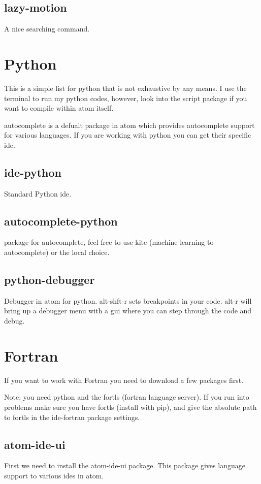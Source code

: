\documentclass[preprint,showpacs,preprintnumbers,amsmath,amssymb]{revtex4}
\begin{document}
\subsection{lazy-motion}
A nice searching command.

\section{Python}
This is a simple list for python that is not exhaustive by any means.
I use the terminal to run my python codes, however, look into the script package
if you want to compile within atom itself.

autocomplete is a defualt package in atom which provides autocomplete support
for various languages.
If you are working with python you can get their specific ide.

\subsection{ide-python}
Standard Python ide.

\subsection{autocomplete-python}
package for autocomplete, feel free to use kite (machine learning to
autocomplete) or the local choice.

\subsection{python-debugger}
Debugger in atom for python.
alt-shft-r sets breakpoints in your code.
alt-r will bring up a debugger menu with a gui where you can step through the
code and debug.

\section{Fortran}
If you want to work with Fortran you need to download a few packages first.

Note: you need python and the fortls (fortran language server).
If you run into problems make sure you have fortls (install with pip), and
give the absolute path to fortls in the ide-fortran package settings.

\subsection{atom-ide-ui}
First we need to install the atom-ide-ui package.
This package gives language support to various ides in atom.
\end{document}
